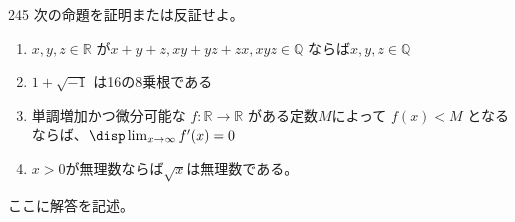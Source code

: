 \begin{thm}{245}{}{}
 次の命題を証明または反証せよ。
 \begin{enumerate}
  \item $x,y,z\in\mathbb{R}$ が$x+y+z,xy+yz+zx,xyz\in\mathbb{Q}$ ならば$x,y,z\in\mathbb{Q}$
  \item $1+\sqrt{-1}$ は16の8乗根である
  \item 単調増加かつ微分可能な $f:\mathbb{R}\rightarrow\mathbb{R}$ がある定数$M$によって $f(x)<M$ となるならば、$\disp \lim_{x\to\infty} f'(x)=0$
  \item $x>0$が無理数ならば$\sqrt{x}$は無理数である。
 \end{enumerate}
\end{thm}

ここに解答を記述。
